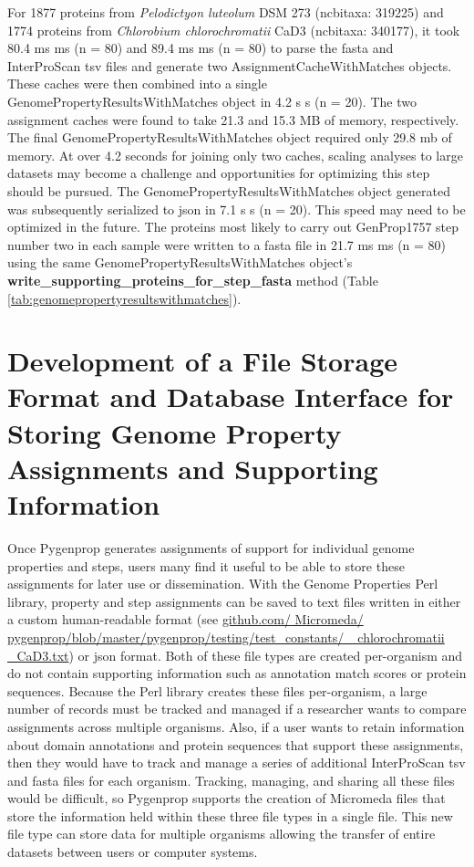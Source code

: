 For 1877 proteins from \textit{Pelodictyon luteolum} DSM 273 (\gls{ncbitaxa}: 
319225) and 1774 proteins from \textit{Chlorobium chlorochromatii} CaD3 
(\gls{ncbitaxa}: 340177), it took 80.4 ms  ms (\gls{n} = 80) and 89.4 
ms  ms (\gls{n} = 80) to parse the \gls{fasta} and InterProScan 
\gls{tsv} files and generate two AssignmentCacheWithMatches objects. These 
caches were then combined into a single GenomePropertyResultsWithMatches object 
in 4.2 s  s (\gls{n} = 20). The two assignment caches were found to 
take 21.3 and 15.3 MB of memory, respectively. The final 
GenomePropertyResultsWithMatches object required only 29.8 \gls{mb} of memory. 
At over 4.2 seconds for joining only two caches, scaling analyses to large 
datasets may become a challenge and opportunities for optimizing this step 
should be pursued. The GenomePropertyResultsWithMatches object generated was 
subsequently serialized to \gls{json} in 7.1 s  s (\gls{n} = 20). 
This speed may need to be optimized in the future. The proteins most likely to 
carry out GenProp1757 step number two in each sample were written to a 
\gls{fasta} file in 21.7 ms  ms (\gls{n} = 80) using the same 
GenomePropertyResultsWithMatches object's 
\textbf{write\_supporting\_proteins\_for\_step\_fasta} method (Table 
\ref{tab:genomepropertyresultswithmatches}).

\section{Development of a File Storage Format and Database Interface for Storing 
Genome Property Assignments and Supporting Information} \label{MicromedaFiles}

Once Pygenprop generates assignments of support for individual genome properties 
and steps, users many find it useful to be able to store these assignments for later 
use or dissemination. With the Genome Properties Perl library, property and step 
assignments can be saved to text files written in either a custom human-readable 
format (see 
\href{http://github.com/Micromeda/pygenprop/blob/master/pygenprop/testing/test_constants/C_chlorochromatii_CaD3.txt}{github.com/ Micromeda/ 
pygenprop/blob/master/pygenprop/testing/test\_constants/ \_chlorochromatii \_CaD3.txt}) 
or \gls{json} format. Both of these file types are created per-organism and do 
not contain supporting information such as annotation match scores or protein 
sequences. Because the Perl library creates these files per-organism, a large 
number of records must be tracked and managed if a researcher wants to compare 
assignments across multiple organisms. Also, if a user wants to retain 
information about domain annotations and protein sequences that support these 
assignments, then they would have to track and manage a series of additional 
InterProScan \gls{tsv} and \gls{fasta} files for each organism. Tracking, managing, 
and sharing all these files would be difficult, so Pygenprop supports the 
creation of Micromeda files that store the information held within these three 
file types in a single file. This new file type can store data for multiple 
organisms allowing the transfer of entire datasets between users or computer 
systems.

